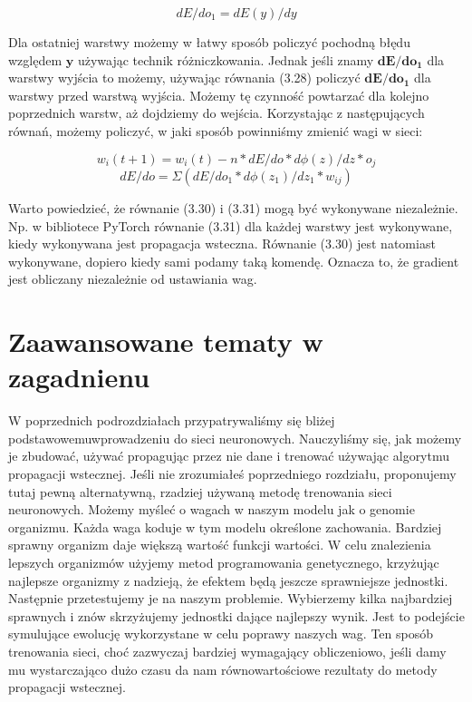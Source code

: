 \begin{equation}
dE/do_1 = dE(y) / dy
\end{equation}

\noindent Dla ostatniej warstwy możemy w łatwy sposób policzyć pochodną błędu względem $\boldsymbol{y}$ używając technik różniczkowania. Jednak jeśli znamy $\boldsymbol{dE/do_1}$ dla warstwy wyjścia to możemy, używając równania (3.28) policzyć $\boldsymbol{dE/do_1}$ dla warstwy przed warstwą wyjścia. Możemy tę czynność powtarzać dla kolejno poprzednich warstw, aż dojdziemy do wejścia. Korzystając z następujących równań, możemy policzyć, w jaki sposób powinniśmy zmienić wagi w sieci:

\begin{equation}
w_i(t+1) = w_i(t) - n * dE/do * d \phi(z)/dz * o_j
\end{equation}
\begin{equation}
dE/do = \Sigma(dE/do_1 * d \phi(z_1)/dz_1 * w_{ij})
\end{equation}

\noindent Warto powiedzieć, że równanie (3.30) i (3.31) mogą być wykonywane niezależnie. Np. w bibliotece PyTorch równanie (3.31) dla każdej warstwy jest wykonywane, kiedy wykonywana jest propagacja wsteczna. Równanie (3.30) jest natomiast wykonywane, dopiero kiedy sami podamy taką komendę. Oznacza to, że gradient jest obliczany niezależnie od ustawiania wag.\newpage


\section{Zaawansowane tematy w zagadnienu}

W poprzednich podrozdziałach przypatrywaliśmy się bliżej podstawowemu\break wprowadzeniu do sieci neuronowych. Nauczyliśmy się, jak możemy je zbudować, używać propagując przez nie dane i trenować używając algorytmu propagacji wstecznej. Jeśli nie zrozumiałeś poprzedniego rozdziału, proponujemy tutaj pewną alternatywną, rzadziej używaną metodę trenowania sieci neuronowych. Możemy myśleć o wagach w naszym modelu jak o genomie organizmu. Każda waga koduje w tym modelu określone zachowania. Bardziej sprawny organizm daje większą wartość funkcji wartości. W celu znalezienia lepszych organizmów użyjemy metod programowania genetycznego, krzyżując najlepsze organizmy z nadzieją, że efektem będą jeszcze sprawniejsze jednostki. Następnie przetestujemy je na naszym problemie. Wybierzemy kilka najbardziej sprawnych i znów skrzyżujemy jednostki dające najlepszy wynik. Jest to podejście symulujące ewolucję wykorzystane w celu poprawy naszych wag. Ten sposób trenowania sieci, choć zazwyczaj bardziej wymagający obliczeniowo, jeśli damy mu wystarczająco dużo czasu da nam równowartościowe rezultaty do metody propagacji wstecznej.\newline

